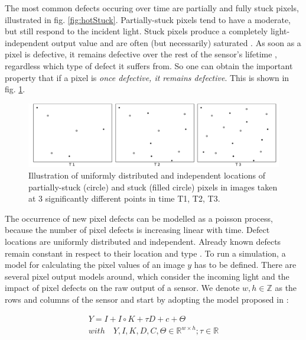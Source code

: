 \documentclass[10pt,twocolumn,letterpaper]{article}
\begin{document}
The most common defects occuring over time are partially and fully stuck pixels, illustrated in fig. \ref{fig:hotStuck}. Partially-stuck pixels tend to have a moderate, but still respond to the incident light. Stuck pixels produce a completely light-independent output value and are often (but necessarily) saturated \cite{fridrich}. As soon as a pixel is defective, it remains defective over the rest of the sensor's lifetime \cite{failureSemi}, regardless which type of defect it suffers from. So one can obtain the important property that if a pixel is \emph{once defective, it remains defective}. This is shown in fig. \ref{fig:defectLocations}.

\begin{figure}
\centering
\includegraphics[width=\linewidth]{img/defectLocations.png}
\caption{Illustration of uniformly distributed and independent locations of partially-stuck (circle) and stuck (filled circle) pixels in images taken at 3 significantly different points in time T1, T2, T3.}
\label{fig:defectLocations}
\end{figure}

The occurrence of new pixel defects can be modelled as a poisson process, because the number of pixel defects is increasing linear with time. Defect locations are uniformly distributed and independent. Already known defects remain constant in respect to their location and type \cite{fridrich, defectIdentification}. 
To run a simulation, a model for calculating the pixel values of an image $y$ has to be defined. There are several pixel output models around, which consider the incoming light and the impact of pixel defects on the raw output of a sensor. We denote $w,h \in \mathbb{Z}$ as the rows and columns of the sensor and start by adopting the model proposed in \cite{fridrich}:

\begin{equation}
\begin{aligned}
 Y = I+I \circ K+\tau D +c+\Theta \\ with \quad Y,I,K,D,C, \Theta \in \mathbb{R}^{w \times h}; \tau \in \mathbb{R}
\end{aligned}
  \label{equ:pixelmodel}
 \end{equation}
\end{document}
